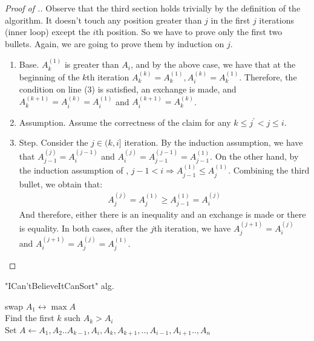 \documentclass[manuscript,screen,review]{acmart}
\begin{document}
  \begin{proof}[Proof of .]
  Observe that the third section holds trivially by the definition of the algorithm. It doesn't touch any position greater than $j$ in the first $j$ iterations (inner loop) except the $i$th position. So we have to prove only the first two bullets. Again, we are going to prove them by induction on $j$.  
  \begin{enumerate}
    \item Base. $A^{(1)}_{k}$ is greater than $A_{i}$, and by the above case, we have that at the beginning of the $k$th iteration $A^{(k)}_{k}=A^{(1)}_{k}, A^{(k)}_{i}=A^{(1)}_{k}$. Therefore, the condition on line (3) is satisfied, an exchange is made, and $A^{(k+1)}_{k} =A^{(k)}_{i} = A^{(1)}_{i}$ and $A^{(k+1)}_{i} = A^{(k)}_{k}$. %
    \item Assumption. Assume the correctness of the claim for any $k \le j^{\prime} < j \le i$. 
    \item Step. Consider the $j \in (k,i]$ iteration. By the induction assumption, we have that $A^{(j)}_{j-1} = A^{(j-1)}_{i}$ and $A^{(j)}_{i} = A^{(j-1)}_{j-1} = A^{(1)}_{j-1}$. On the other hand, by the induction assumption of , $j-1 < i \Rightarrow A^{(1)}_{j-1} \le A^{(1)}_{j}$. Combining the third bullet, we obtain that:                
      \begin{equation*}
        \begin{split}
          A^{(j)}_{j} = A^{(1)}_{j} \ge A^{(1)}_{j-1} = A^{(j)}_{i}
        \end{split}
      \end{equation*}
      And therefore, either there is an inequality and an exchange is made or there is equality. In both cases, after the $j$th iteration, we have $A^{(j+1)}_{j} = A^{(j)}_{i}$ and $A^{(j+1)}_{i} = A^{(j)}_{j} = A^{(1)}_{j}$.
  \end{enumerate}
\end{proof}


\begin{algorithm}

\SetAlgoLined
{}
\caption{ "ICan'tBelieveItCanSort"  alg.}
swap $A_{1} \leftrightarrow \max A$ \\
 {
    Find the first $k$ such $A_{k} > A_{i}$ \\
    Set $A \leftarrow A_{1},A_{2}..A_{k-1},A_{i},A_{k},A_{k+1},..,A_{i-1},A_{i+1}..,A_{n}$
}
\end{algorithm}
\end{document}
